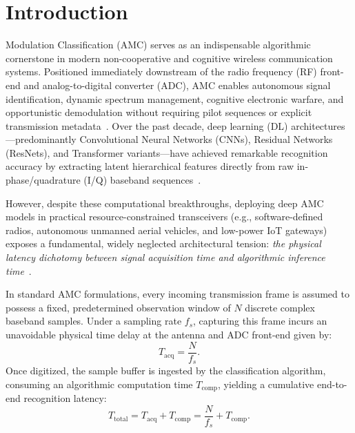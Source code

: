 
\section{Introduction}
\label{sec:introduction}

 Modulation Classification (AMC) serves as an indispensable algorithmic cornerstone in modern non-cooperative and cognitive wireless communication systems. Positioned immediately downstream of the radio frequency (RF) front-end and analog-to-digital converter (ADC), AMC enables autonomous signal identification, dynamic spectrum management, cognitive electronic warfare, and opportunistic demodulation without requiring pilot sequences or explicit transmission metadata~\cite{sathyanarayanan2023rml22,wang2025survey}. Over the past decade, deep learning (DL) architectures—predominantly Convolutional Neural Networks (CNNs), Residual Networks (ResNets), and Transformer variants—have achieved remarkable recognition accuracy by extracting latent hierarchical features directly from raw in-phase/quadrature (I/Q) baseband sequences~\cite{gao2026mlea,quan2026fftformer}.

However, despite these computational breakthroughs, deploying deep AMC models in practical resource-constrained transceivers (e.g., software-defined radios, autonomous unmanned aerial vehicles, and low-power IoT gateways) exposes a fundamental, widely neglected architectural tension: \emph{the physical latency dichotomy between signal acquisition time and algorithmic inference time}~\cite{guo2025fewer,denboer2021fpga}. 

In standard AMC formulations, every incoming transmission frame is assumed to possess a fixed, predetermined observation window of $N$ discrete complex baseband samples. Under a sampling rate $f_s$, capturing this frame incurs an unavoidable physical time delay at the antenna and ADC front-end given by:
\begin{equation}
    T_{\text{acq}} = \frac{N}{f_s}.
    \label{eq:t_acq_intro}
\end{equation}
Once digitized, the sample buffer is ingested by the classification algorithm, consuming an algorithmic computation time $T_{\text{comp}}$, yielding a cumulative end-to-end recognition latency:
\begin{equation}
    T_{\text{total}} = T_{\text{acq}} + T_{\text{comp}} = \frac{N}{f_s} + T_{\text{comp}}.
    \label{eq:t_total_intro}
\end{equation}

